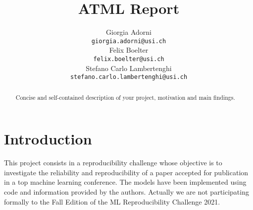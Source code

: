 \documentclass{article}
\title{ATML Report}
\author{%
		Giorgia Adorni \\
		\texttt{giorgia.adorni@usi.ch} \\
		\And
		Felix Boelter\\
		\texttt{felix.boelter@usi.ch}\\
		\And
		Stefano Carlo Lambertenghi\\
		\texttt{stefano.carlo.lambertenghi@usi.ch}\\
}
\begin{document}
	
	\maketitle
	
	\begin{abstract}
		Concise and self-contained description of your project, motivation and main findings.
	\end{abstract}
	
%	
%	
%	
	
	\section{Introduction}
	This project consists in a reproducibility challenge whose objective is to investigate the 
	reliability and reproducibility of a paper accepted for publication in a top machine learning 
	conference.
	The models have been implemented using code and information provided by the authors.	
	Actually we are not participating formally to the Fall Edition of the ML Reproducibility Challenge 2021.
	
\end{document}
